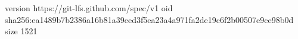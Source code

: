 version https://git-lfs.github.com/spec/v1
oid sha256:ea1489b7b2386a16b81a39eed3f5ea23a4a971fa2de19c6f2b00507e9ce98b0d
size 1521
